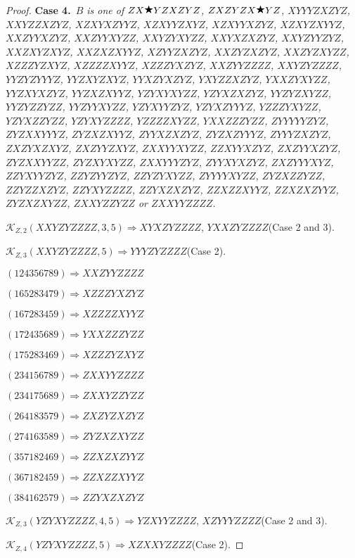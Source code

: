 \documentclass[12pt]{article}
\theoremstyle{plain}
\theoremstyle{definition}
\theoremstyle{remark}
\newcommand{\fancy}[1]{\mathcal{#1}}
\def\K{\fancy{K}}
\newcommand{\case}[2]{{\bf Case #1.}~{\it #2}~~}
\newcommand{\wild}{\raisebox{0.75\depth}{$\bigstar$}}
\begin{document}
\begin{proof}
	\bigskip
	\case{4}{$B$ is one of $ZX\wild YZXZYZ$, $ZXZYZX\wild YZ$, $XYYYZXZYZ$, $XXYZZXZYZ$, $XZXYXZYYZ$, $XZXYYZXYZ$, $XZXYYXZYZ$, $XZXYZXYYZ$, $XXZYYXZYZ$, $XXZYYXYZZ$, $XXYZYXYZZ$, $XXYXZXZYZ$, $XXYZYYZYZ$, $XXZXYZXYZ$, $XXZXZXYYZ$, $XZYYZXZYZ$, $XXZYZXZYZ$, $XXZYZXYZZ$, $XZZZYZXYZ$, $XZZZZXYYZ$, $XZZZYXZYZ$, $XXZYYZZZZ$, $XXYZYZZZZ$, $YYZYZYYYZ$, $YYZXYZXYZ$, $YYXZYXZYZ$, $YXYZZXZYZ$, $YXXZYXYZZ$, $YYZXYXZYZ$, $YYZXZXYYZ$, $YZYXYXYZZ$, $YZYXZXZYZ$, $YYZYZXYZZ$, $YYZYZZYZZ$, $YYZYYXYZZ$, $YZYXYYZYZ$, $YZYXZYYYZ$, $YZZZYXYZZ$, $YZYXZZYZZ$, $YZYXYZZZZ$, $YZZZZXYZZ$, $YXXZZZYZZ$, $ZYYYYYZYZ$, $ZYZXXYYYZ$, $ZYZXZXYYZ$, $ZYYXZXZYZ$, $ZYZXZYYYZ$, $ZYYYZXZYZ$, $ZXZYXZXYZ$, $ZXZYYZXYZ$, $ZXXYYXYZZ$, $ZZXYYXZYZ$, $ZXZYYXZYZ$, $ZYZXXYYZZ$, $ZYZXYXYZZ$, $ZXXYYYZYZ$, $ZYYXYXZYZ$, $ZXZYYYXYZ$, $ZZYXYYZYZ$, $ZZYZYYZYZ$, $ZZYZYXYZZ$, $ZYYYYXYZZ$, $ZYZXZZYZZ$, $ZZYZZXZYZ$, $ZZYXYZZZZ$, $ZZYXZXZYZ$, $ZZXZZXYYZ$, $ZZXZXZYYZ$, $ZYZXZXYZZ$, $ZXXYZZYZZ$ or $ZXXYYZZZZ$.}
	
	\bigskip
	
	$\K_{Z,2}(XXYZYZZZZ,3, 5)\Rightarrow $$XYXZYZZZZ$, $YXXZYZZZZ$(Case 2 and 3).
	
	$\K_{Z,3}(XXYZYZZZZ,5)\Rightarrow $$YYYZYZZZZ$(Case 2).
	
	
	
	$(1 2 4 3 5 6 7 8 9)\Rightarrow XXZYYZZZZ$
	
	$(1 6 5 2 8 3 4 7 9)\Rightarrow XZZZYXZYZ$
	
	$(1 6 7 2 8 3 4 5 9)\Rightarrow XZZZZXYYZ$
	
	$(1 7 2 4 3 5 6 8 9)\Rightarrow YXXZZZYZZ$
	
	$(1 7 5 2 8 3 4 6 9)\Rightarrow XZZZYZXYZ$
	
	$(2 3 4 1 5 6 7 8 9)\Rightarrow ZXXYYZZZZ$
	
	$(2 3 4 1 7 5 6 8 9)\Rightarrow ZXXYZZYZZ$
	
	$(2 6 4 1 8 3 5 7 9)\Rightarrow ZXZYZXZYZ$
	
	$(2 7 4 1 6 3 5 8 9)\Rightarrow ZYZXZXYZZ$
	
	$(3 5 7 1 8 2 4 6 9)\Rightarrow ZZXZXZYYZ$
	
	$(3 6 7 1 8 2 4 5 9)\Rightarrow ZZXZZXYYZ$
	
	$(3 8 4 1 6 2 5 7 9)\Rightarrow ZZYXZXZYZ$
	
	
	
	$\K_{Z,3}(YZYXYZZZZ,4, 5)\Rightarrow $$YZXYYZZZZ$, $XZYYYZZZZ$(Case 2 and 3).
	
	$\K_{Z,4}(YZYXYZZZZ,5)\Rightarrow $$XZXXYZZZZ$(Case 2).
	

\end{proof}
\end{document}
